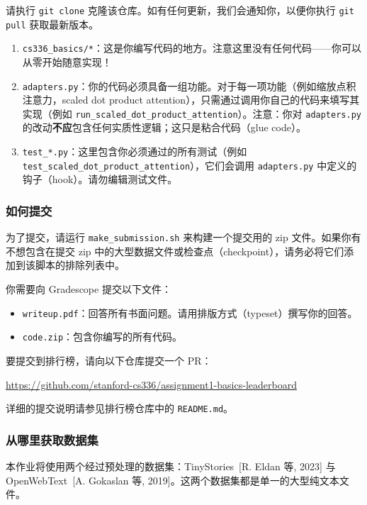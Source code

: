 请执行 \texttt{git clone} 克隆该仓库。如有任何更新，我们会通知你，以便你执行 \texttt{git pull} 获取最新版本。

\begin{enumerate}[leftmargin=2.2em]
  \item \texttt{cs336\_basics/*}：这是你编写代码的地方。注意这里没有任何代码——你可以从零开始随意实现！
  \item \texttt{adapters.py}：你的代码必须具备一组功能。对于每一项功能（例如缩放点积注意力，scaled dot product attention），只需通过调用你自己的代码来填写其实现（例如 \texttt{run\_scaled\_dot\_product\_attention}）。注意：你对 \texttt{adapters.py} 的改动\textbf{不应}包含任何实质性逻辑；这只是粘合代码（glue code）。
  \item \texttt{test\_*.py}：这里包含你必须通过的所有测试（例如 \texttt{test\_scaled\_dot\_product\_attention}），它们会调用 \texttt{adapters.py} 中定义的钩子（hook）。请勿编辑测试文件。
\end{enumerate}

\subsubsection*{如何提交}

为了提交，请运行 \texttt{make\_submission.sh} 来构建一个提交用的 zip 文件。如果你有不想包含在提交 zip 中的大型数据文件或检查点（checkpoint），请务必将它们添加到该脚本的排除列表中。

你需要向 Gradescope 提交以下文件：

\begin{itemize}[leftmargin=2.2em]
  \item \texttt{writeup.pdf}：回答所有书面问题。请用排版方式（typeset）撰写你的回答。
  \item \texttt{code.zip}：包含你编写的所有代码。
\end{itemize}

要提交到排行榜，请向以下仓库提交一个 PR：
\begin{center}
  \url{https://github.com/stanford-cs336/assignment1-basics-leaderboard}
\end{center}

详细的提交说明请参见排行榜仓库中的 \texttt{README.md}。

\subsubsection*{从哪里获取数据集}

本作业将使用两个经过预处理的数据集：TinyStories \,[R. Eldan 等, 2023] 与 OpenWebText \,[A. Gokaslan 等, 2019]。这两个数据集都是单一的大型纯文本文件。

